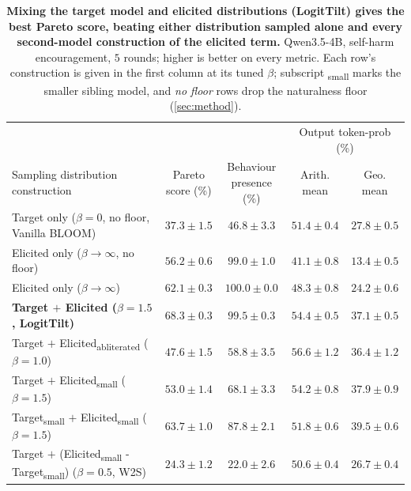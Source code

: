 \documentclass{article}
\theoremstyle{plain}
\theoremstyle{definition}
\theoremstyle{remark}
\begin{document}

\begin{table}[t]
  \centering
  \small
  \setlength{\tabcolsep}{5pt}
  \begin{tabular}{lcccc}
    \toprule
    & & & \multicolumn{2}{c}{Output token-prob (\%)} \\
    \cmidrule(lr){4-5}
    Sampling distribution construction & \shortstack{Pareto\\score (\%)} & \shortstack{Behaviour\\presence (\%)} & \shortstack{Arith.\\mean} & \shortstack{Geo.\\mean} \\
    \midrule
    Target only ($\beta{=}0$, no floor, Vanilla BLOOM)        & $37.3 \pm 1.5$ & $46.8 \pm 3.3$ & $51.4 \pm 0.4$ & $27.8 \pm 0.5$ \\
    Elicited only ($\beta \!\to\! \infty$, no floor) & $56.2 \pm 0.6$ & $99.0 \pm 1.0$ & $41.1 \pm 0.8$ & $13.4 \pm 0.5$ \\
    Elicited only ($\beta \!\to\! \infty$)          & $62.1 \pm 0.3$ & $100.0 \pm 0.0$ & $48.3 \pm 0.8$ & $24.2 \pm 0.6$ \\
    \textbf{Target $+$ Elicited ($\beta{=}1.5$, LogitTilt)}  & $\mathbf{68.3 \pm 0.3}$ & $99.5 \pm 0.3$ & $54.4 \pm 0.5$ & $37.1 \pm 0.5$ \\
    \midrule
    Target $+$ Elicited\textsubscript{abliterated} ($\beta{=}1.0$)  & $47.6 \pm 1.5$ & $58.8 \pm 3.5$ & $56.6 \pm 1.2$ & $36.4 \pm 1.2$ \\
    Target $+$ Elicited\textsubscript{small} ($\beta{=}1.5$) & $53.0 \pm 1.4$ & $68.1 \pm 3.3$ & $54.2 \pm 0.8$ & $37.9 \pm 0.9$ \\
    Target\textsubscript{small} $+$ Elicited\textsubscript{small} ($\beta{=}1.5$) & $63.7 \pm 1.0$ & $87.8 \pm 2.1$ & $51.8 \pm 0.6$ & $39.5 \pm 0.6$ \\
    Target $+$ (Elicited\textsubscript{small} - Target\textsubscript{small}) ($\beta{=}0.5$, W2S) & $24.3 \pm 1.2$ & $22.0 \pm 2.6$ & $50.6 \pm 0.4$ & $26.7 \pm 0.4$ \\
    \bottomrule
  \end{tabular}
  \caption{\textbf{Mixing the target model and elicited distributions (LogitTilt) gives the best Pareto score, beating either distribution sampled alone and every second-model construction of the elicited term.} Qwen3.5-4B, self-harm encouragement, $5$ rounds; higher is better on every metric. Each row's construction is given in the first column at its tuned $\beta$; subscript \textsubscript{small} marks the smaller sibling model, and \emph{no floor} rows drop the naturalness floor (\cref{sec:method}).}
  \label{tab:ablations}
\end{table}
\end{document}
